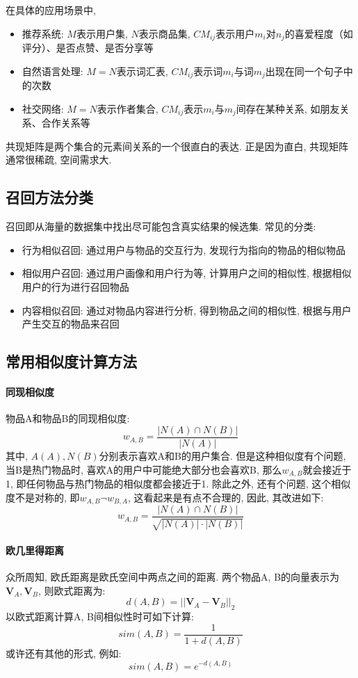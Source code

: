 在具体的应用场景中, 
\begin{itemize}
	\item 推荐系统: $M$表示用户集, $N$表示商品集, $CM_{ij}$表示用户$m_i$对$n_j$的喜爱程度（如评分）、是否点赞、是否分享等
	\item 自然语言处理: $M = N$表示词汇表, $CM_{ij}$表示词$m_i$与词$m_j$出现在同一个句子中的次数
	\item 社交网络: $M=N$表示作者集合, $CM_{ij}$表示$m_i$与$m_j$间存在某种关系, 如朋友关系、合作关系等
\end{itemize}
共现矩阵是两个集合的元素间关系的一个很直白的表达. 正是因为直白, 共现矩阵通常很稀疏, 空间需求大. 

\subsection{召回方法分类}
召回即从海量的数据集中找出尽可能包含真实结果的候选集. 常见的分类: 
\begin{itemize}
	\item 行为相似召回: 通过用户与物品的交互行为, 发现行为指向的物品的相似物品
	\item 相似用户召回: 通过用户画像和用户行为等, 计算用户之间的相似性, 根据相似用户的行为进行召回物品
	\item 内容相似召回: 通过对物品内容进行分析, 得到物品之间的相似性, 根据与用户产生交互的物品来召回
\end{itemize}


\subsection{常用相似度计算方法}
\paragraph{同现相似度}
物品A和物品B的同现相似度: 
$$
w_{A,B} = \frac{|N(A) \cap N(B)|}{|N(A)|}
$$
其中, $A(A), N(B)$分别表示喜欢A和B的用户集合. 但是这种相似度有个问题, 当B是热门物品时, 喜欢A的用户中可能绝大部分也会喜欢B, 那么$w_{A,B}$就会接近于1, 即任何物品与热门物品的相似度都会接近于1. 除此之外, 还有个问题, 这个相似度不是对称的, 即$w_{A,B} \neg w_{B,A}$, 这看起来是有点不合理的, 因此, 其改进如下: 
$$
w_{A,B} = \frac{|N(A) \cap N(B)|}{\sqrt{|N(A)| \cdot |N(B)|}}
$$

\paragraph{欧几里得距离}
众所周知, 欧氏距离是欧氏空间中两点之间的距离. 两个物品A, B的向量表示为$\boldsymbol{V}_A, \boldsymbol{V}_B$, 则欧式距离为: 
$$
d(A, B) = ||\boldsymbol{V}_A - \boldsymbol{V}_B||_2
$$
以欧式距离计算A, B间相似性时可如下计算: 
$$
sim(A, B) = \frac{1}{1 + d(A, B)}
$$
或许还有其他的形式, 例如: 
$$
sim(A, B) = e^{-d(A, B)}
$$

